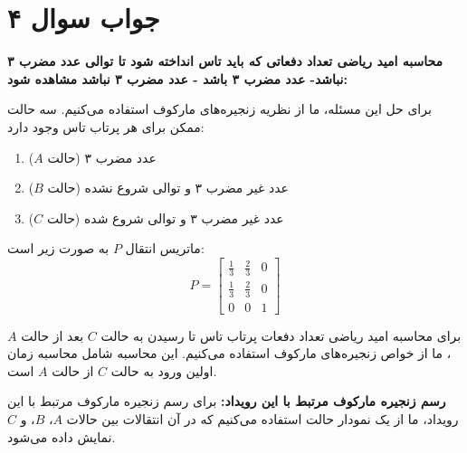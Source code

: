 \section*{جواب سوال ۴}

\textbf{محاسبه امید ریاضی تعداد دفعاتی که باید تاس انداخته شود تا توالی عدد مضرب ۳ نباشد- عدد مضرب ۳ باشد - عدد مضرب ۳ نباشد مشاهده شود:}

برای حل این مسئله، ما از نظریه زنجیره‌های مارکوف استفاده می‌کنیم. سه حالت ممکن برای هر پرتاب تاس وجود دارد:
\begin{enumerate}
	\item عدد مضرب ۳ (حالت \(A\))
	\item عدد غیر مضرب ۳ و توالی شروع نشده (حالت \(B\))
	\item عدد غیر مضرب ۳ و توالی شروع شده (حالت \(C\))
\end{enumerate}

ماتریس انتقال \(P\) به صورت زیر است:
\[ P = \begin{bmatrix}
	\frac{1}{3} & \frac{2}{3} & 0 \\
	\frac{1}{3} & \frac{2}{3} & 0 \\
	0 & 0 & 1
\end{bmatrix} \]

برای محاسبه امید ریاضی تعداد دفعات پرتاب تاس تا رسیدن به حالت \(C\) بعد از حالت \(A\)، ما از خواص زنجیره‌های مارکوف استفاده می‌کنیم. این محاسبه شامل محاسبه زمان اولین ورود به حالت \(C\) از حالت \(A\) است.

\textbf{رسم زنجیره مارکوف مرتبط با این رویداد:}
برای رسم زنجیره مارکوف مرتبط با این رویداد، ما از یک نمودار حالت استفاده می‌کنیم که در آن انتقالات بین حالات \(A\)، \(B\)، و \(C\) نمایش داده می‌شود.